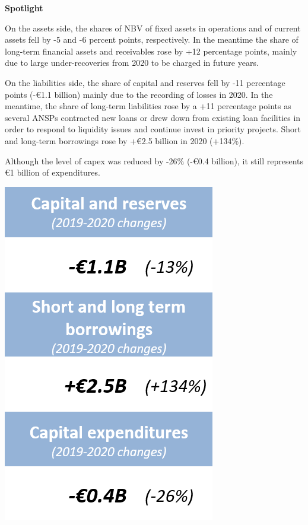 \documentclass[
]{book}
\begin{document}
\begin{infobox}

\begin{left}
\textbf{Spotlight}

On the assets side, the shares of NBV of fixed assets in operations and
of current assets fell by -5 and -6 percent points, respectively. In the
meantime the share of long-term financial assets and receivables rose by
+12 percentage points, mainly due to large under-recoveries from 2020 to
be charged in future years.

On the liabilities side, the share of capital and reserves fell by -11
percentage points (-€1.1 billion) mainly due to the recording of losses
in 2020. In the meantime, the share of long-term liabilities rose by a
+11 percentage points as several ANSPs contracted new loans or drew down
from existing loan facilities in order to respond to liquidity issues
and continue invest in priority projects. Short and long-term borrowings
rose by +€2.5 billion in 2020 (+134\%).

Although the level of capex was reduced by -26\% (-€0.4 billion), it
still represents €1 billion of expenditures.

\end{left}

\begin{right}

\begin{center}\includegraphics[width=0.9\linewidth]{figures/Figure-5-2} \end{center}


\end{right}
\end{infobox}
\end{document}
